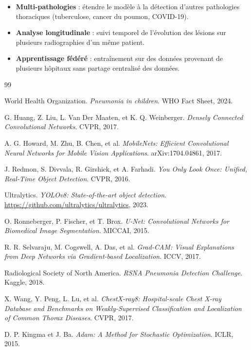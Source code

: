 \documentclass[12pt,a4paper,twoside]{report}
\begin{document}
\begin{itemize}
  \item \textbf{Multi-pathologies} : étendre le modèle à la détection d'autres pathologies thoraciques (tuberculose, cancer du poumon, COVID-19).
  \item \textbf{Analyse longitudinale} : suivi temporel de l'évolution des lésions sur plusieurs radiographies d'un même patient.
  \item \textbf{Apprentissage fédéré} : entraînement sur des données provenant de plusieurs hôpitaux sans partage centralisé des données.
\end{itemize}

\begin{thebibliography}{99}

World Health Organization. \textit{Pneumonia in children}. WHO Fact Sheet, 2024.

G. Huang, Z. Liu, L. Van Der Maaten, et K. Q. Weinberger. \textit{Densely Connected Convolutional Networks}. CVPR, 2017.

A. G. Howard, M. Zhu, B. Chen, et al. \textit{MobileNets: Efficient Convolutional Neural Networks for Mobile Vision Applications}. arXiv:1704.04861, 2017.

J. Redmon, S. Divvala, R. Girshick, et A. Farhadi. \textit{You Only Look Once: Unified, Real-Time Object Detection}. CVPR, 2016.

Ultralytics. \textit{YOLOv8: State-of-the-art object detection}. \url{https://github.com/ultralytics/ultralytics}, 2023.

O. Ronneberger, P. Fischer, et T. Brox. \textit{U-Net: Convolutional Networks for Biomedical Image Segmentation}. MICCAI, 2015.

R. R. Selvaraju, M. Cogswell, A. Das, et al. \textit{Grad-CAM: Visual Explanations from Deep Networks via Gradient-based Localization}. ICCV, 2017.

Radiological Society of North America. \textit{RSNA Pneumonia Detection Challenge}. Kaggle, 2018.

X. Wang, Y. Peng, L. Lu, et al. \textit{ChestX-ray8: Hospital-scale Chest X-ray Database and Benchmarks on Weakly-Supervised Classification and Localization of Common Thorax Diseases}. CVPR, 2017.

D. P. Kingma et J. Ba. \textit{Adam: A Method for Stochastic Optimization}. ICLR, 2015.

\end{thebibliography}
\end{document}
